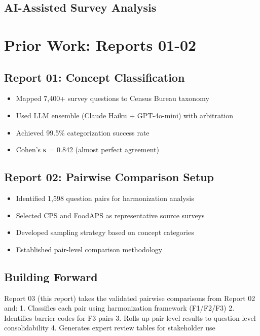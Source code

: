 \documentclass[
  letterpaper,
]{report}
\providecommand{\tightlist}{%
  \setlength{\itemsep}{0pt}\setlength{\parskip}{0pt}}
\begin{document}
\subsection{AI-Assisted Survey
Analysis}\label{ai-assisted-survey-analysis}

\section{Prior Work: Reports 01-02}\label{prior-work-reports-01-02}

\subsection{Report 01: Concept
Classification}\label{report-01-concept-classification}

\begin{itemize}
\tightlist
\item
  Mapped 7,400+ survey questions to Census Bureau taxonomy
\item
  Used LLM ensemble (Claude Haiku + GPT-4o-mini) with arbitration
\item
  Achieved 99.5\% categorization success rate
\item
  Cohen's κ = 0.842 (almost perfect agreement)
\end{itemize}

\subsection{Report 02: Pairwise Comparison
Setup}\label{report-02-pairwise-comparison-setup}

\begin{itemize}
\tightlist
\item
  Identified 1,598 question pairs for harmonization analysis
\item
  Selected CPS and FoodAPS as representative source surveys
\item
  Developed sampling strategy based on concept categories
\item
  Established pair-level comparison methodology
\end{itemize}

\subsection{Building Forward}\label{building-forward}

Report 03 (this report) takes the validated pairwise comparisons from
Report 02 and: 1. Classifies each pair using harmonization framework
(F1/F2/F3) 2. Identifies barrier codes for F3 pairs 3. Rolls up
pair-level results to question-level consolidability 4. Generates expert
review tables for stakeholder use
\end{document}
